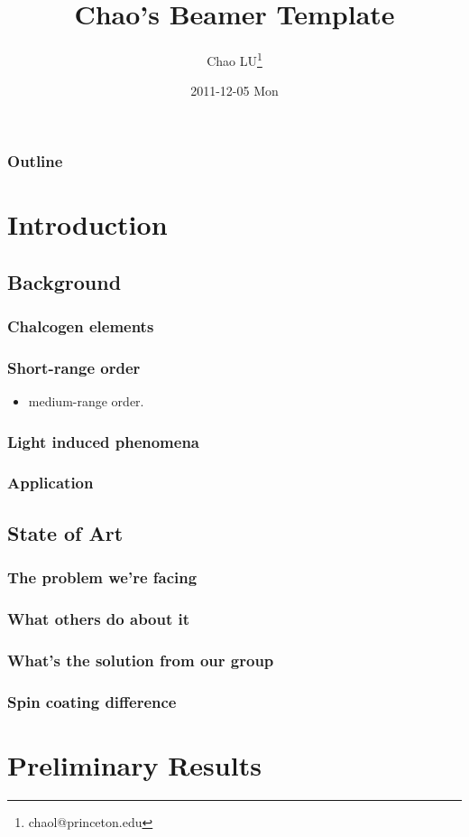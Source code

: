 \documentclass[bigger, english, 10pt, presentation]{beamer}
\title{Chao's Beamer Template}
\author{Chao LU\thanks{chaol@princeton.edu}}
\date{2011-12-05 Mon}
\begin{document}
\maketitle

\begin{frame}
\frametitle{Outline}
\setcounter{tocdepth}{3}
\tableofcontents
\end{frame}



\section{Introduction}
\label{sec-1}
\subsection{Background}
\label{sec-1-1}
\begin{frame}
\frametitle{Chalcogen elements}
\label{sec-1-1-1}
\end{frame}
\begin{frame}
\frametitle{Short-range order}
\label{sec-1-1-2}

\begin{itemize}
\item medium-range order.
\end{itemize}
\end{frame}
\begin{frame}
\frametitle{Light induced phenomena}
\label{sec-1-1-3}
\end{frame}
\begin{frame}
\frametitle{Application}
\label{sec-1-1-4}
\end{frame}
\subsection{State of Art}
\label{sec-1-2}
\begin{frame}
\frametitle{The problem we're facing}
\label{sec-1-2-1}
\end{frame}
\begin{frame}
\frametitle{What others do about it}
\label{sec-1-2-2}
\end{frame}
\begin{frame}
\frametitle{What's the solution from our group}
\label{sec-1-2-3}
\end{frame}
\begin{frame}
\frametitle{Spin coating difference}
\label{sec-1-2-4}
\end{frame}
\section{Preliminary Results}
\label{sec-2}
\end{document}
